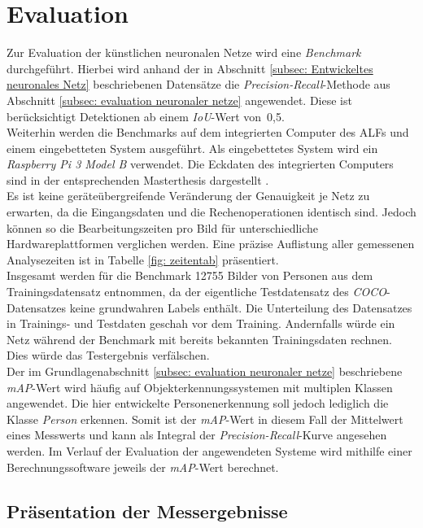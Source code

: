 \chapter{Evaluation}
\label{ch: Verifikation}
Zur Evaluation der künstlichen neuronalen Netze wird eine \textit{Benchmark} durchgeführt. Hierbei wird anhand der in Abschnitt \ref{subsec: Entwickeltes neuronales Netz} beschriebenen Datensätze die \textit{Precision-Recall}-Methode aus Abschnitt \ref{subsec: evaluation neuronaler netze} angewendet. Diese ist berücksichtigt Detektionen ab einem \textit{IoU}-Wert von~0,5.\\

 Weiterhin werden die Benchmarks auf dem integrierten Computer des ALFs und einem eingebetteten System ausgeführt. Als eingebettetes System wird ein \textit{Raspberry Pi 3 Model B} verwendet. Die Eckdaten des integrierten Computers sind in der entsprechenden Masterthesis dargestellt \cite{alf}.\\

Es ist keine geräteübergreifende Veränderung der Genauigkeit je Netz zu erwarten, da die Eingangsdaten und die Rechenoperationen identisch sind. Jedoch können so die Bearbeitungszeiten pro Bild für unterschiedliche Hardwareplattformen verglichen werden. Eine präzise Auflistung aller gemessenen Analysezeiten ist in Tabelle \ref{fig: zeitentab} präsentiert. \\

Insgesamt werden für die Benchmark 12755 Bilder von Personen aus dem Trainingsdatensatz entnommen, da der eigentliche Testdatensatz des \textit{COCO}-Datensatzes keine grundwahren Labels enthält. Die Unterteilung des Datensatzes in Trainings- und Testdaten geschah vor dem Training. Andernfalls würde ein Netz während der Benchmark mit bereits bekannten Trainingsdaten rechnen. Dies würde das Testergebnis verfälschen. \\
 

Der im Grundlagenabschnitt \ref{subsec: evaluation neuronaler netze} beschriebene \textit{mAP}-Wert wird häufig auf Objekterkennungssystemen mit multiplen Klassen angewendet. Die hier entwickelte Personenerkennung soll jedoch lediglich die Klasse \textit{Person} erkennen. Somit ist der \textit{mAP}-Wert in diesem Fall der Mittelwert eines Messwerts und kann als Integral der \textit{Precision-Recall}-Kurve angesehen werden. Im Verlauf der Evaluation der angewendeten Systeme wird mithilfe einer Berechnungssoftware jeweils der \textit{mAP}-Wert berechnet.
 
\section{Präsentation der Messergebnisse} 

